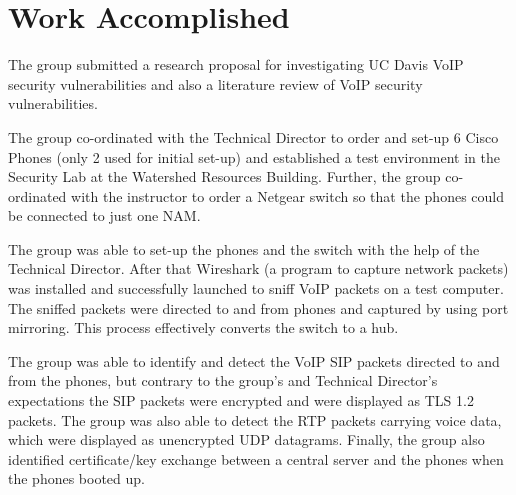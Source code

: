 \section{Work Accomplished}


The group submitted a research proposal for investigating UC Davis VoIP security vulnerabilities and also a literature review of VoIP security vulnerabilities.

 The group co-ordinated with the Technical Director to order and set-up 6 Cisco Phones (only 2 used for initial set-up) and established a test environment in the Security Lab at the Watershed Resources Building. Further, the group co-ordinated with the instructor to order a Netgear switch so that the phones could be connected to  just one NAM.
 
 The group was able to set-up the phones and the switch with the help of the Technical Director. After that Wireshark (a program to capture network packets) was installed and successfully launched to sniff VoIP packets on a test computer. The sniffed packets were directed to and from phones and captured by using port mirroring. This process effectively converts the switch to a hub. 
 
 The group was able to identify and detect the VoIP SIP packets directed to and from the phones, but contrary to the group's and Technical Director's expectations the SIP packets were encrypted and were displayed as TLS 1.2 packets. The group was also able to detect the RTP packets carrying voice data, which were displayed as unencrypted UDP datagrams. Finally, the group also identified certificate/key exchange between a central server and the phones when the phones booted up.
 
 
 